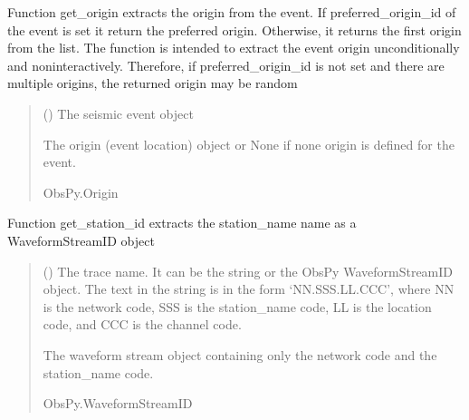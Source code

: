 \documentclass[letterpaper,10pt,english]{sphinxmanual}
\begin{document}
\begin{fulllineitems}
\label{\detokenize{api_core:core.utils.get_origin}}
\pysigstartsignatures
{}
\pysigstopsignatures
\sphinxAtStartPar
Function get\_origin extracts the origin from the event.
If preferred\_origin\_id of the event is set it return the preferred origin.
Otherwise, it returns the first origin from the list.
The function is intended to extract the event origin unconditionally and non\sphinxhyphen{}interactively.
Therefore, if preferred\_origin\_id is not set and there are multiple origins, the returned origin may be random
\begin{quote}\begin{description}
\sphinxAtStartPar
{} () \textendash{} The seismic event object

\sphinxAtStartPar
The origin (event location) object or None if none origin is defined for the event.

\sphinxAtStartPar
ObsPy.Origin

\end{description}\end{quote}

\end{fulllineitems}


\begin{fulllineitems}
\label{\detokenize{api_core:core.utils.get_station_id}}
\pysigstartsignatures
{}
\pysigstopsignatures
\sphinxAtStartPar
Function get\_station\_id extracts the station\_name name as a WaveformStreamID object
\begin{quote}\begin{description}
\sphinxAtStartPar
{} () \textendash{} The trace name. It can be the string or the ObsPy WaveformStreamID object.
The text in the string is in the form ‘NN.SSS.LL.CCC’, where NN is the network code,
SSS is the station\_name code, LL is the location code, and CCC is the channel code.

\sphinxAtStartPar
The waveform stream object containing only the network code and the station\_name code.

\sphinxAtStartPar
ObsPy.WaveformStreamID

\end{description}\end{quote}

\end{fulllineitems}
\end{document}
